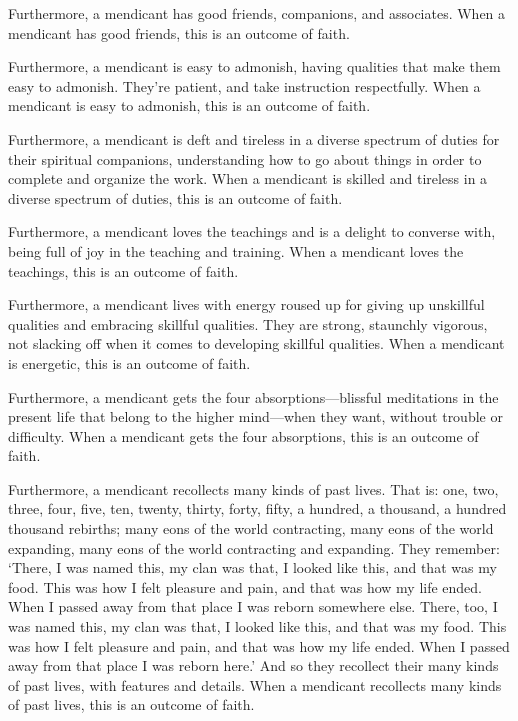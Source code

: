 \documentclass[12pt,openany]{book}%
\begin{document}
Furthermore, a mendicant has good friends, companions, and associates. When a mendicant has good friends, this is an outcome of faith. 

Furthermore, a mendicant is easy to admonish, having qualities that make them easy to admonish. They’re patient, and take instruction respectfully. When a mendicant is easy to admonish, this is an outcome of faith. 

Furthermore, a mendicant is deft and tireless in a diverse spectrum of duties for their spiritual companions, understanding how to go about things in order to complete and organize the work. When a mendicant is skilled and tireless in a diverse spectrum of duties, this is an outcome of faith. 

Furthermore, a mendicant loves the teachings and is a delight to converse with, being full of joy in the teaching and training. When a mendicant loves the teachings, this is an outcome of faith. 

Furthermore, a mendicant lives with energy roused up for giving up unskillful qualities and embracing skillful qualities. They are strong, staunchly vigorous, not slacking off when it comes to developing skillful qualities. When a mendicant is energetic, this is an outcome of faith. 

Furthermore, a mendicant gets the four absorptions—blissful meditations in the present life that belong to the higher mind—when they want, without trouble or difficulty. When a mendicant gets the four absorptions, this is an outcome of faith. 

Furthermore, a mendicant recollects many kinds of past lives. That is: one, two, three, four, five, ten, twenty, thirty, forty, fifty, a hundred, a thousand, a hundred thousand rebirths; many eons of the world contracting, many eons of the world expanding, many eons of the world contracting and expanding. They remember: ‘There, I was named this, my clan was that, I looked like this, and that was my food. This was how I felt pleasure and pain, and that was how my life ended. When I passed away from that place I was reborn somewhere else. There, too, I was named this, my clan was that, I looked like this, and that was my food. This was how I felt pleasure and pain, and that was how my life ended. When I passed away from that place I was reborn here.’ And so they recollect their many kinds of past lives, with features and details. When a mendicant recollects many kinds of past lives, this is an outcome of faith. 
\end{document}
